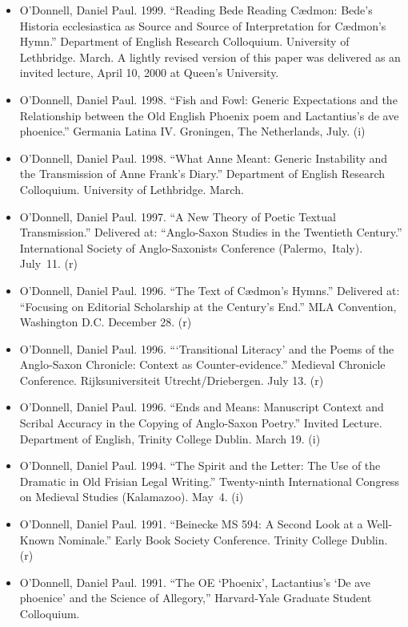 \documentclass[12pt]{article}
\begin{document}
\begin{itemize}
  \item O'Donnell, Daniel Paul. 1999. “Reading Bede Reading Cædmon: Bede’s Historia ecclesiastica as Source and Source of Interpretation for Cædmon’s Hymn.” Department of English Research Colloquium. University of Lethbridge. March.  A lightly revised version of this paper was delivered as an invited lecture, April 10, 2000 at Queen’s University.
  \item O'Donnell, Daniel Paul. 1998. “Fish and Fowl: Generic Expectations and the Relationship between the Old English Phoenix poem and Lactantius’s de ave phoenice.” Germania Latina IV. Groningen, The Netherlands, July. (i)
  \item O'Donnell, Daniel Paul. 1998. “What Anne Meant: Generic Instability and the Transmission of Anne Frank’s Diary.” Department of English Research Colloquium. University of Lethbridge. March.
  \item O'Donnell, Daniel Paul. 1997. “A New Theory of Poetic Textual Transmission.” Delivered at: “Anglo-Saxon Studies in the Twentieth Century.” International Society of Anglo-Saxonists Conference (Palermo, Italy). July 11. (r)
  \item O'Donnell, Daniel Paul. 1996. “The Text of Cædmon’s Hymns.” Delivered at: “Focusing on Editorial Scholarship at the Century’s End.” MLA Convention, Washington D.C. December 28. (r)
  \item O'Donnell, Daniel Paul. 1996. “‘Transitional Literacy’ and the Poems of the Anglo-Saxon Chronicle: Context as Counter-evidence.” Medieval Chronicle Conference. Rijksuniversiteit Utrecht/Driebergen. July 13. (r)
  \item O'Donnell, Daniel Paul. 1996. “Ends and Means: Manuscript Context and Scribal Accuracy in the Copying of Anglo-Saxon Poetry.” Invited Lecture. Department of English, Trinity College Dublin. March 19. (i)
  \item O'Donnell\*, Daniel Paul. 1994. “The Spirit and the Letter: The Use of the Dramatic in Old Frisian Legal Writing.” Twenty-ninth International Congress on Medieval Studies (Kalamazoo). May 4. (i)
  \item O'Donnell\*, Daniel Paul. 1991. “Beinecke MS 594: A Second Look at a Well-Known Nominale.” Early Book Society Conference. Trinity College Dublin. (r)
  \item O'Donnell\*, Daniel Paul. 1991. “The OE ‘Phoenix’, Lactantius’s ‘De ave phoenice’ and the Science of Allegory,” Harvard-Yale Graduate Student Colloquium.
\end{itemize}
\end{document}
